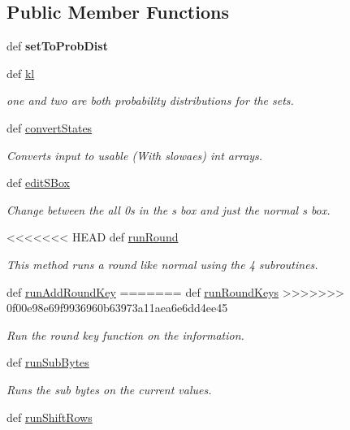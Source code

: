 \subsection*{Public Member Functions}
\begin{DoxyCompactItemize}
\item 
\hypertarget{classsimplegui_1_1_main_scene_a2c8156bf798a6cbcc85f8f70b92877c1}{def {\bfseries set\-To\-Prob\-Dist}}\label{classsimplegui_1_1_main_scene_a2c8156bf798a6cbcc85f8f70b92877c1}

\item 
def \hyperlink{classsimplegui_1_1_main_scene_ac7eb263562c3f9a992a00d43ddd7d1a6}{kl}
\begin{DoxyCompactList}\small\item\em one and two are both probability distributions for the sets. \end{DoxyCompactList}\item 
def \hyperlink{classsimplegui_1_1_main_scene_a2fedafb26922217bff2c9b4f0a1e1980}{convert\-States}
\begin{DoxyCompactList}\small\item\em Converts input to usable (With slowaes) int arrays. \end{DoxyCompactList}\item 
def \hyperlink{classsimplegui_1_1_main_scene_a464f594963c80652f89a341d86e675ab}{edit\-S\-Box}
\begin{DoxyCompactList}\small\item\em Change between the all 0s in the s box and just the normal s box. \end{DoxyCompactList}\item 
<<<<<<< HEAD
def \hyperlink{classsimplegui_1_1_main_scene_a3e84e45150794e1806472cd45904f9b9}{run\-Round}
\begin{DoxyCompactList}\small\item\em This method runs a round like normal using the 4 subroutines. \end{DoxyCompactList}\item 
def \hyperlink{classsimplegui_1_1_main_scene_a13363bc98bb9603d8c0ab35d52cc853b}{run\-Add\-Round\-Key}
=======
def \hyperlink{classsimplegui_1_1_main_scene_a6616923509a481f8ab7c99a2764ef5ec}{run\-Round\-Keys}
>>>>>>> 0f00e98e69f9936960b63973a11aea6e6dd4ee45
\begin{DoxyCompactList}\small\item\em Run the round key function on the information. \end{DoxyCompactList}\item 
def \hyperlink{classsimplegui_1_1_main_scene_a8e81494def3ea3c0e56813f6d702a435}{run\-Sub\-Bytes}
\begin{DoxyCompactList}\small\item\em Runs the sub bytes on the current values. \end{DoxyCompactList}\item 
\hypertarget{classsimplegui_1_1_main_scene_a900ce77068dfc386d298f7ef1243529a}{def \hyperlink{classsimplegui_1_1_main_scene_a900ce77068dfc386d298f7ef1243529a}{run\-Shift\-Rows}}\label{classsimplegui_1_1_main_scene_a900ce77068dfc386d298f7ef1243529a}


\end{DoxyCompactItemize}
